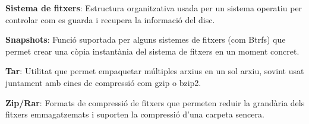 \documentclass[
  12 pt,
  a4paper,
]{article}
\begin{document}
\textbf{Sistema de fitxers}: Estructura organitzativa usada per un
sistema operatiu per controlar com es guarda i recupera la informació
del disc.

\textbf{Snapshots}: Funció suportada per alguns sistemes de fitxers (com
Btrfs) que permet crear una còpia instantània del sistema de fitxers en
un moment concret.

\textbf{Tar}: Utilitat que permet empaquetar múltiples arxius en un sol
arxiu, sovint usat juntament amb eines de compressió com gzip o bzip2.

\textbf{Zip/Rar}: Formats de compressió de fitxers que permeten reduir
la grandària dels fitxers emmagatzemats i suporten la compressió d'una
carpeta sencera.
\end{document}
